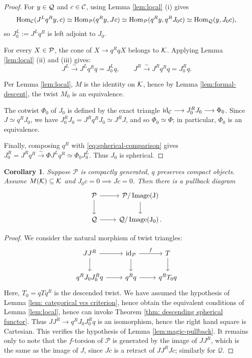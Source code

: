 \documentclass[12pt, letter]{amsart}
\newtheorem{corollary}[dummy]{Corollary}
\theoremstyle{definition}
\begin{document}
\begin{proof}
For \(y\in\mathcal{Q}\) and \(c\in\mathcal{C}\), using Lemma \ref{lem:local} (i)  gives
\[
  \operatorname{Hom}_{\mathcal{C}}(J^L q^R y,c)
  \simeq\operatorname{Hom}_{\mathcal{P}}(q^R y,Jc)
  \simeq\operatorname{Hom}_{\mathcal{P}}(q^R y,q^R J_0c)
  \simeq\operatorname{Hom}_{\mathcal{Q}}(y,J_0c),
\]
so $J_0^L:= J^L q^R$ is left adjoint to $J_0$.  

For every \(X\in\mathcal{P}\), the cone of \(X\to q^R qX\) belongs to \(\mathcal{K}\).
Applying  Lemma \ref{lem:local} (ii) and (iii) gives:
\[
  J^L \xrightarrow{\sim}J^L q^R q=J_0^L q,
  \qquad
  J^R \xrightarrow{\sim}J^R q^R q=J_0^R q.
\]

Per Lemma \ref{lem:local}, $M$ is the identity on $\mathcal{K}$, hence by Lemma \ref{lem:formal-descent}, the twist $M_0$ is an equivalence.

The  cotwist $\Phi_0$ of \(J_0\) is
defined by the exact triangle 
$
  \mathrm{id}_{\mathcal{C}}\longrightarrow J_0^RJ_0\longrightarrow\Phi_0
$.
Since \(J\simeq q^R J_0\), we have 
$
  J_0^R J_0=J^R q^R J_0\simeq J^R J
$, and so 
$\Phi_0\simeq\Phi$; in particular, $\Phi_0$ is an equivalence.

Finally, composing $q^R$ with 
\eqref{eq:spherical-comparison} gives  
$
  J_0^R =J^R q^R \xrightarrow{\sim}\Phi J^L q^R \simeq \Phi_0 J_0^L.
$
Thus $J_0$ is spherical. 
\end{proof}


\begin{corollary} \label{cor:pullback from spherical} 
Suppose $\mathcal{P}$ is compactly generated, $q$ preserves compact objects.   Assume $M(\mathcal{K})\subseteq\mathcal{K}$ and  $J_0 c = 0 \implies Jc =0$.   Then there is a pullback diagram
    \[
\begin{tikzcd}
 \cP
 \ar[r]\ar[d]
 &
 \cP / \operatorname{Image(J)}
 \ar[d]
 \\
 \cQ
 \ar[r]
 &
 \cQ / \operatorname{Image(J_0)}.
\end{tikzcd}
\]

\end{corollary}
\begin{proof}
We consider the natural morphism of twist triangles:  
    \[
\begin{tikzcd}
 J J^R
 \ar[r]\ar[d]
 &
 \mathrm{id}_{\cP}
 \ar[d] \ar[r, "f"] & T \ar[d] 
 \\
 q^R J_0 J_0^R q \ar[r] & q^R q 
 \ar[r] & q^R T_0 q
\end{tikzcd}
\]
Here, $T_0 = q T q^R$ is the descended twist. 
We have assumed the hypothesis of Lemma \ref{lem: categorical vcs criterion}, hence obtain the equivalent conditions of Lemma \ref{lem:local}, hence can invoke Theorem \ref{thm: descending spherical functor}.   Thus  $JJ^R \to q^R J_0 J_0^R q$ is an isomorphism, hence the right hand square is Cartesian.  This verifies the hypothesis of Lemma \ref{lem:magic-pullback}.  It remains only to note that the $f$-torsion of $\mathcal{P}$ is generated by the image of $JJ^R$, which is the same as the image of $J$, since $Jc$ is a retract of $JJ^RJc$; similarly for $\mathcal{Q}$. 
\end{proof}
\end{document}
